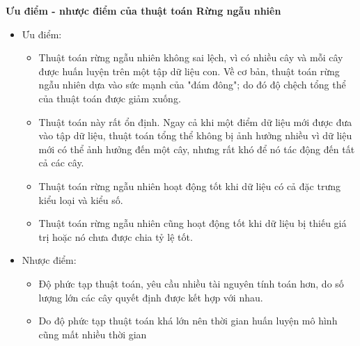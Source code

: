 \documentclass{article}
\begin{document}
	\textbf{Ưu điểm - nhược điểm của thuật toán Rừng ngẫu nhiên}
	\begin{itemize}
		\item Ưu điểm:
		\begin{itemize}
			\item Thuật toán rừng ngẫu nhiên không sai lệch, vì có nhiều cây và mỗi cây được huấn luyện trên một tập dữ liệu con. Về cơ bản, thuật toán rừng ngẫu nhiên dựa vào sức mạnh của "đám đông"; do đó độ chệch tổng thể của thuật toán được giảm xuống.
			
			\item Thuật toán này rất ổn định. Ngay cả khi một điểm dữ liệu mới được đưa vào tập dữ liệu, thuật toán tổng thể không bị ảnh hưởng nhiều vì dữ liệu mới có thể ảnh hưởng đến một cây, nhưng rất khó để nó tác động đến tất cả các cây.
			
			\item Thuật toán rừng ngẫu nhiên hoạt động tốt khi dữ liệu có cả đặc trưng kiểu loại và kiểu số.
			
			\item Thuật toán rừng ngẫu nhiên cũng hoạt động tốt khi dữ liệu bị thiếu giá trị hoặc nó chưa được chia tỷ lệ tốt.
		\end{itemize}
		\item Nhược điểm:
		\begin{itemize}
			\item Độ phức tạp thuật toán, yêu cầu nhiều tài nguyên tính toán hơn, do số lượng lớn các cây quyết định được kết hợp với nhau.
			\item Do độ phức tạp thuật toán khá lớn nên thời gian huấn luyện mô hình cũng mất nhiều thời gian
		\end{itemize}
	\end{itemize}
\end{document}
